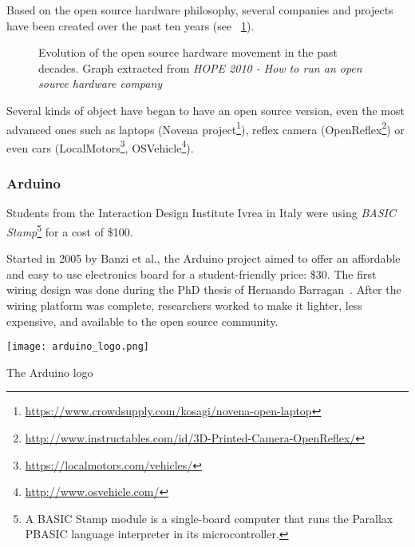 Based on the open source hardware philosophy, several companies and projects have been created over the past ten years (see \figurename~\ref{fig:oh_evolution}).

\begin{figure}[h]
\centering
    \hfil
    \caption{Evolution of the open source hardware movement in the past decades. Graph extracted from \emph{HOPE 2010 - How to run an open source hardware company}}
    \label{fig:oh_evolution}
\end{figure}


Several kinds of object have began to have an open source version, even the most advanced ones such as laptops (Novena project\footnote{\url{https://www.crowdsupply.com/kosagi/novena-open-laptop}}), reflex camera (OpenReflex\footnote{\url{http://www.instructables.com/id/3D-Printed-Camera-OpenReflex/}}) or even cars (LocalMotors\footnote{\url{https://localmotors.com/vehicles/}}, OSVehicle\footnote{\url{http://www.osvehicle.com/}}).


\subsubsection{Arduino} %

Students from the Interaction Design Institute Ivrea in Italy were using \emph{BASIC Stamp}\footnote{A BASIC Stamp module is a single-board computer that runs the Parallax PBASIC language interpreter in its microcontroller.} for a cost of \$100.

\begin{row}{4}{2}
    \begin{cell}{3}
      Started in 2005 by Banzi et al., the Arduino project aimed to offer an affordable and easy to use electronics board for a student-friendly price: \$30. The first wiring design was done during the PhD thesis of Hernando Barragan~\cite{barragan2004wiring}. After the wiring platform was complete, researchers worked to make it lighter, less expensive, and available to the open source community.
    \end{cell}
    \begin{cell}{1}
        \begin{NFfigure}
            \centering
                \texttt{[image: arduino\_logo.png]}
            \caption{The Arduino logo}
            \label{fig:arduino_logo}
        \end{NFfigure}
    \end{cell}
\end{row}

